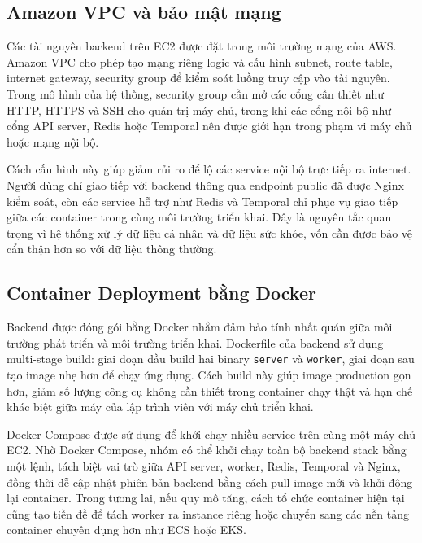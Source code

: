 \subsection{Amazon VPC và bảo mật mạng}
\par Các tài nguyên backend trên EC2 được đặt trong môi trường mạng của AWS. Amazon VPC cho phép tạo mạng riêng logic và cấu hình subnet, route table, internet gateway, security group để kiểm soát luồng truy cập vào tài nguyên. Trong mô hình của hệ thống, security group cần mở các cổng cần thiết như HTTP, HTTPS và SSH cho quản trị máy chủ, trong khi các cổng nội bộ như cổng API server, Redis hoặc Temporal nên được giới hạn trong phạm vi máy chủ hoặc mạng nội bộ.

\par Cách cấu hình này giúp giảm rủi ro để lộ các service nội bộ trực tiếp ra internet. Người dùng chỉ giao tiếp với backend thông qua endpoint public đã được Nginx kiểm soát, còn các service hỗ trợ như Redis và Temporal chỉ phục vụ giao tiếp giữa các container trong cùng môi trường triển khai. Đây là nguyên tắc quan trọng vì hệ thống xử lý dữ liệu cá nhân và dữ liệu sức khỏe, vốn cần được bảo vệ cẩn thận hơn so với dữ liệu thông thường.

\subsection{Container Deployment bằng Docker}
\par Backend được đóng gói bằng Docker nhằm đảm bảo tính nhất quán giữa môi trường phát triển và môi trường triển khai. Dockerfile của backend sử dụng multi-stage build: giai đoạn đầu build hai binary \texttt{server} và \texttt{worker}, giai đoạn sau tạo image nhẹ hơn để chạy ứng dụng. Cách build này giúp image production gọn hơn, giảm số lượng công cụ không cần thiết trong container chạy thật và hạn chế khác biệt giữa máy của lập trình viên với máy chủ triển khai.

\par Docker Compose được sử dụng để khởi chạy nhiều service trên cùng một máy chủ EC2. Nhờ Docker Compose, nhóm có thể khởi chạy toàn bộ backend stack bằng một lệnh, tách biệt vai trò giữa API server, worker, Redis, Temporal và Nginx, đồng thời dễ cập nhật phiên bản backend bằng cách pull image mới và khởi động lại container. Trong tương lai, nếu quy mô tăng, cách tổ chức container hiện tại cũng tạo tiền đề để tách worker ra instance riêng hoặc chuyển sang các nền tảng container chuyên dụng hơn như ECS hoặc EKS.

